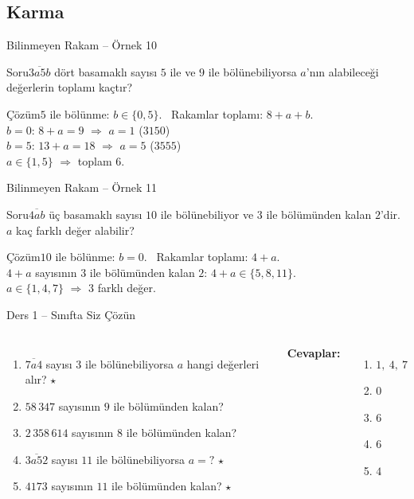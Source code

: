 \documentclass[aspectratio=169,11pt,handout]{beamer}
\newcommand{\soru}[3]{%
\begin{frame}{#1}
  \begin{block}{Soru}\large #2\end{block}
  \pause
  \begin{exampleblock}{Çözüm}\large #3\end{exampleblock}
\end{frame}}
\newcommand{\ab}[1]{\overline{#1}}
\begin{document}
\subsection{Karma}
\soru{Bilinmeyen Rakam -- Örnek 10}
{\(\ab{3a5b}\) dört basamaklı sayısı \(5\) ile ve \(9\) ile bölünebiliyorsa \(a\)'nın alabileceği değerlerin toplamı kaçtır?}
{\(5\) ile bölünme: \(b\in\{0,5\}\). \ Rakamlar toplamı: \(8+a+b\).\\[3pt]
\(b=0\): \(8+a=9\) \(\Rightarrow\) \(a=1\) \quad (\(3150\))\\[3pt]
\(b=5\): \(13+a=18\) \(\Rightarrow\) \(a=5\) \quad (\(3555\))\\[3pt]
\(a\in\{1,5\}\) \(\Rightarrow\) toplam \(6\).}

\soru{Bilinmeyen Rakam -- Örnek 11}
{\(\ab{4ab}\) üç basamaklı sayısı \(10\) ile bölünebiliyor ve \(3\) ile bölümünden kalan \(2\)'dir. \(a\) kaç farklı değer alabilir?}
{\(10\) ile bölünme: \(b=0\). \ Rakamlar toplamı: \(4+a\).\\[3pt]
\(4+a\) sayısının \(3\) ile bölümünden kalan \(2\): \(4+a\in\{5,8,11\}\).\\[3pt]
\(a\in\{1,4,7\}\) \(\Rightarrow\) \(3\) farklı değer.}

\begin{frame}{Ders 1 -- Sınıfta Siz Çözün}
\begin{columns}[t]
\begin{enumerate}
\item \(\ab{7a4}\) sayısı \(3\) ile bölünebiliyorsa \(a\) hangi değerleri alır? \(\star\)
\item \(58\,347\) sayısının \(9\) ile bölümünden kalan?
\item \(2\,358\,614\) sayısının \(8\) ile bölümünden kalan?
\item \(\ab{3a52}\) sayısı \(11\) ile bölünebiliyorsa \(a=?\) \(\star\)
\item \(4173\) sayısının \(11\) ile bölümünden kalan? \(\star\)
\end{enumerate}
\pause
\textbf{Cevaplar:}
\begin{enumerate}
\item \(1,\ 4,\ 7\)
\item \(0\)
\item \(6\)
\item \(6\)
\item \(4\)
\end{enumerate}
\end{columns}
\vspace{4pt}{\footnotesize \(\star\) işaretli soruların adım adım çözümü sonraki slaytlardadır.}
\end{frame}
\end{document}

